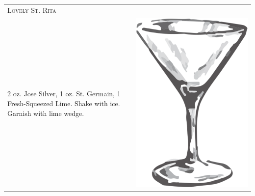 \documentclass{article}
\begin{document}
\begin{tabular}{p{2in} p{0.5in}}
  \multicolumn{2}{p{3in}}{\centering\Huge\textsc{Lovely St. Rita}} \\ 
  
   \vspace{-0.1in}2 oz. Jose Silver, 1 oz. St. Germain, 1 Fresh-Squeezed
    Lime. Shake with ice.  Garnish with lime wedge. &
   \vspace{-0.1in} \includegraphics{goblet.png}
\end{tabular}
\end{document}

